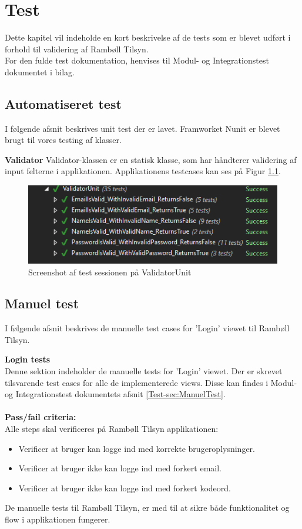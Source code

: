 \chapter{Test}
Dette kapitel vil indeholde en kort beskrivelse af de tests som er blevet udført i forhold til validering af Rambøll Tilsyn. \\
For den fulde test dokumentation, henvises til Modul- og Integrationstest dokumentet i bilag. \\

\section{Automatiseret test}
I følgende afsnit beskrives unit test der er lavet. Framworket Nunit\cite{NUnit} er blevet brugt til vores testing af klasser. 

\textbf{Validator}
Validator-klassen er en statisk klasse, som har håndterer validering af input felterne i applikationen. Applikationens testcases kan ses på Figur \ref{fig:ValidatorUnit}.
\begin{figure}[H]
	\centering
	\includegraphics[width=0.6\linewidth]{Test/ValidatorUnit}
	\caption{Screenshot af test sessionen på ValidatorUnit}
	\label{fig:ValidatorUnit}
\end{figure}

\section{Manuel test}
I følgende afsnit beskrives de manuelle test cases for 'Login' viewet til Rambøll Tilsyn.

\textbf{Login tests} \\
Denne sektion indeholder de manuelle tests for 'Login' viewet. Der er skrevet tilsvarende test cases for alle de implementerede views. Disse kan findes i Modul- og Integrationstest dokumentets afsnit \ref{Test-sec:ManuelTest}. \\ \\
\textbf{Pass/fail criteria:} \\
Alle steps skal verificeres på Rambøll Tilsyn applikationen:
\begin{itemize}[-]
	\item Verificer at bruger kan logge ind med korrekte brugeroplysninger.
	\item Verificer at bruger ikke kan logge ind med forkert email.
	\item Verificer at bruger ikke kan logge ind med forkert kodeord.
\end{itemize}
De manuelle tests til Rambøll Tilsyn, er med til at sikre både funktionalitet og flow i applikationen fungerer.
